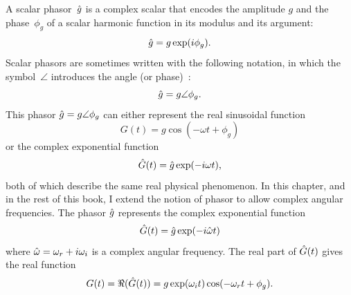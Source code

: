 A scalar phasor~$\hat{g}$ is a complex scalar that encodes the amplitude $g$ and the phase~$\phi_g$ of a scalar harmonic function in its modulus and its argument:
\begin{equation}
    \hat{g} = g \exp(i \phi_g)
    \text{.}
\end{equation}
Scalar phasors are sometimes written with the following notation, in which the symbol~$\angle$ introduces the angle (or phase)~\parencite{nilsson2007electric}:
\begin{equation}
    \hat{g} = g \angle \phi_g
    \text{.}
\end{equation}
This phasor $\hat{g} = g \angle \phi_g$
can either represent the real sinusoidal function
\begin{equation}
    G(t) = g \cos(-\omega t + \phi_g)
\end{equation}
or the complex exponential function
\begin{equation}
    \hat{G}(t) = \hat{g} \exp(-i \omega t)
    \text{,}
\end{equation}
both of which describe the same real physical phenomenon.
In this chapter, and in the rest of this book, I extend the notion of phasor to allow complex angular frequencies.
The phasor $\hat{g}$ represents the complex exponential function
\begin{equation}
    \hat{G}(t) = \hat{g} \exp(-i \hat{\omega} t) \label{eq:phasor}
\end{equation}
where $\hat{\omega} = \omega_r + i \omega_i$ is a complex angular frequency.
The real part of $\hat{G}(t)$ gives the real function
\begin{equation}
    G(t) = \Re(\hat{G}(t)) = g \exp(\omega_i t) \cos(- \omega_r t + \phi_g)
    \text{.}
\end{equation}

